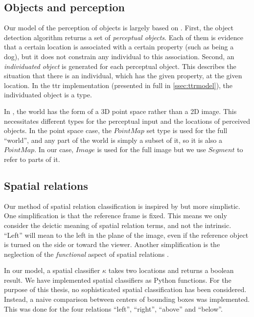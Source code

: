 \subsection{Objects and perception}

Our model of the perception of objects is largely based on \cite{lspc}.
First, the object detection algorithm returns a set of \textit{perceptual objects}.
Each of them is evidence that a certain location is associated with a certain property (such as being a dog), but it does not constrain any individual to this association.
Second, an \textit{individuated object} is generated for each perceptual object.
This describes the situation that there is an individual, which has the given property, at the given location.
In the \gls{ttr} implementation (presented in full in \autoref{ssec:ttrmodel}), the individuated object is a type.

In \cite{lspc}, the world has the form of a 3D point space rather than a 2D image.
This necessitates different types for the perceptual input and the locations of perceived objects.
In the point space case, the $PointMap$ set type is used for the full ``world'', and any part of the world is simply a subset of it, so it is also a $PointMap$.
In our case, $Image$ is used for the full image but we use $Segment$ to refer to parts of it.



\subsection{Spatial relations}
\label{sec:method-spatrel}

Our method of spatial relation classification is inspired by \cite{ttrspat} but more simplistic.
One simplification is that the reference frame is fixed.
This means we only consider the deictic meaning of spatial relation terms, and not the intrinsic.
``Left'' will mean to the left in the plane of the image, even if the reference object is turned on the side or toward the viewer.
Another simplification is the neglection of the \textit{functional} aspect of spatial relations \citep{CoventryInterplayGeometryFunction2001}.

In our model, a spatial classifier $\kappa$ takes two locations and returns a boolean result.
We have implemented spatial classifiers as Python functions.
For the purpose of this thesis, no sophisticated spatial classification has been considered.
Instead, a naive comparison between centers of bounding boxes was implemented.
This was done for the four relations ``left'', ``right'', ``above'' and ``below''.



